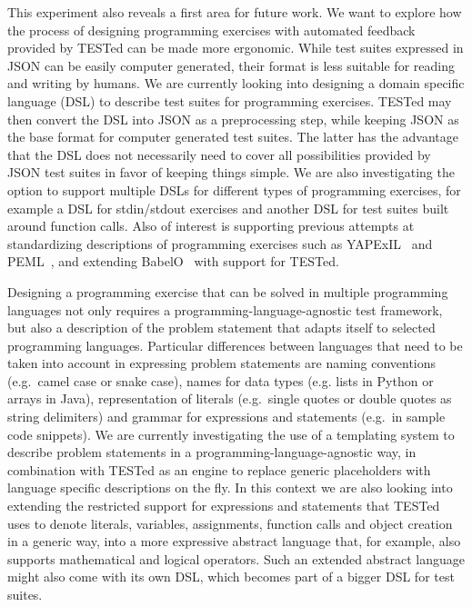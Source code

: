 \documentclass[../main]{subfiles}
\begin{document}
This experiment also reveals a first area for future work.
We want to explore how the process of designing programming exercises with automated feedback provided by TESTed can be made more ergonomic.
While test suites expressed in JSON can be easily computer generated, their format is less suitable for reading and writing by humans.
We are currently looking into designing a domain specific language (DSL) to describe test suites for programming exercises.
TESTed may then convert the DSL into JSON as a preprocessing step, while keeping JSON as the base format for computer generated test suites.
The latter has the advantage that the DSL does not necessarily need to cover all possibilities provided by JSON test suites in favor of keeping things simple.
We are also investigating the option to support multiple DSLs for different types of programming exercises, for example a DSL for stdin/stdout exercises and another DSL for test suites built around function calls.
Also of interest is supporting previous attempts at standardizing descriptions of programming exercises such as YAPExIL~\autocite{paivaAnotherProgrammingExercises2020} and PEML~\autocite{cssplicepemlworkinggroupProgrammingExerciseMarkup2021}, and extending BabelO~\autocite{queirosBabeLOExtensibleConverter2013} with support for TESTed.

Designing a programming exercise that can be solved in multiple programming languages not only requires a programming-language-agnostic test framework, but also a description of the problem statement that adapts itself to selected programming languages.
Particular differences between languages that need to be taken into account in expressing problem statements are naming conventions (e.g.\ camel case or snake case), names for data types (e.g. lists in Python or arrays in Java), representation of literals (e.g.\ single quotes or double quotes as string delimiters) and grammar for expressions and statements (e.g.\ in sample code snippets).
We are currently investigating the use of a templating system to describe problem statements in a programming-language-agnostic way, in combination with TESTed as an engine to replace generic placeholders with language specific descriptions on the fly.
In this context we are also looking into extending the restricted support for expressions and statements that TESTed uses to denote literals, variables, assignments, function calls and object creation in a generic way, into a more expressive abstract language that, for example, also supports mathematical and logical operators.
Such an extended abstract language might also come with its own DSL, which becomes part of a bigger DSL for test suites.
\end{document}
